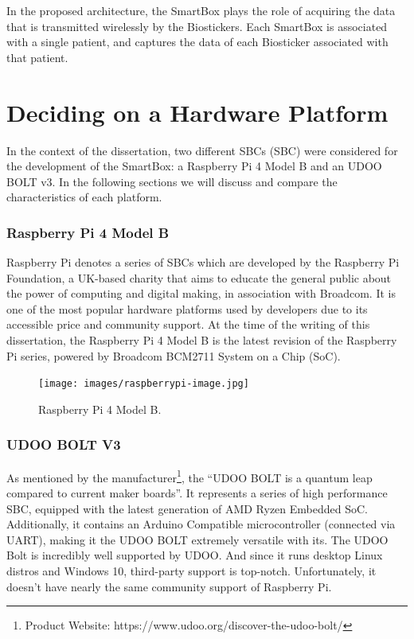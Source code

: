 
In the proposed architecture, the SmartBox plays the role of acquiring the data that is transmitted wirelessly by the Biostickers.
Each SmartBox is associated with a single patient, and captures the data of each Biosticker associated with that patient. 

\section{Deciding on a Hardware Platform}

In the context of the dissertation, two different \acl{SBC}s (\acs{SBC}) were considered for the development of the SmartBox: a Raspberry Pi 4 Model B and an UDOO BOLT v3. In the following sections we will discuss and compare the characteristics of each platform. 

\subsubsection{Raspberry Pi 4 Model B}

Raspberry Pi denotes a series of \acs{SBC}s which are developed by the Raspberry Pi Foundation, a UK-based charity that aims to educate the general public about the power of computing and digital making, in association with Broadcom. It is one of the most popular hardware platforms used by developers due to its accessible price and community support.
At the time of the writing of this dissertation, the Raspberry Pi 4 Model B is the latest revision of the Raspberry Pi series, powered by Broadcom BCM2711 System on a Chip (SoC).

\begin{figure}[H]
    \centering
    \texttt{[image: images/raspberrypi-image.jpg]}
    \caption{Raspberry Pi 4 Model B.}
    \label{fig:raspberrypi-image}
\end{figure}

\subsubsection{UDOO BOLT V3}

As mentioned by the manufacturer\footnote{Product Website: https://www.udoo.org/discover-the-udoo-bolt/}, the ``UDOO BOLT is a quantum leap compared to current maker boards''. It represents a series of high performance \acs{SBC}, equipped with the latest generation of AMD Ryzen Embedded SoC. Additionally, it contains an Arduino Compatible microcontroller (connected via UART), making it the UDOO BOLT extremely versatile with its.
The UDOO Bolt is incredibly well supported by UDOO. And since it runs desktop Linux distros and Windows 10, third-party support is top-notch. Unfortunately, it doesn't have nearly the same community support of Raspberry Pi.

